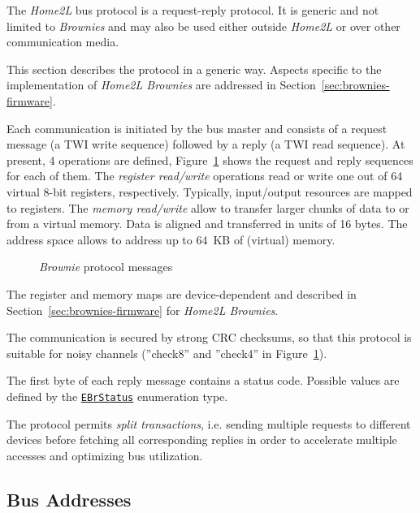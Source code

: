 \documentclass[12pt,english,parskip=half,headheight=19pt]{scrreprt}
\newcommand{\figsvg}[2][]{}            %
\newcommand{\figsvg}[2][]{\href{#2}{}} %
\newcommand{\refapic}[1]{\href{home2l-api_c/index.html}{\mbox{\texttt{#1}}}}            %
\begin{document}
The \textit{Home2L} bus protocol is a request-reply protocol. It is generic and not limited to \textit{Brownies} and may also be used either outside \textit{Home2L} or over other communication media.

This section describes the protocol in a generic way. Aspects specific to the implementation of \textit{Home2L Brownies} are addressed in Section~\ref{sec:brownies-firmware}.

Each communication is initiated by the bus master and consists of a request message (a TWI write sequence) followed by a reply (a TWI read sequence). At present, 4 operations are defined, Figure~\ref{fig:brownies-protocol} shows the request and reply sequences for each of them.
The \textit{register read/write} operations read or write one out of 64 virtual 8-bit registers, respectively. Typically, input/output resources are mapped to registers.
The \textit{memory read/write} allow to transfer larger chunks of data to or from a virtual memory. Data is aligned and transferred in units of 16 bytes. The address space allows to address up to 64~KB of (virtual) memory.

\begin{figure}[ht]
  \centering
  \figsvg[width=\linewidth]{figs/brownies-protocol.svg}
  \caption[l]{\textit{Brownie} protocol messages}
  \label{fig:brownies-protocol}
\end{figure}

The register and memory maps are device-dependent and described in Section~\ref{sec:brownies-firmware} for \textit{Home2L Brownies}.

The communication is secured by strong CRC checksums, so that this protocol is suitable for noisy channels (''check8'' and ''check4'' in Figure~\ref{fig:brownies-protocol}).

The first byte of each reply message contains a status code. Possible values are defined by the \refapic{EBrStatus} enumeration type.

The protocol permits \textit{split transactions}, i.e. sending multiple requests to different devices before fetching all corresponding replies in order to accelerate multiple accesses and optimizing bus utilization.



\subsection{Bus Addresses}
\label{sec:brownies-bus-addressing}
\end{document}
